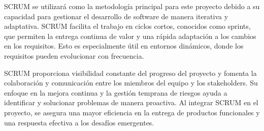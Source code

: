 SCRUM se utilizará como la metodología principal para este proyecto debido a su capacidad para gestionar el desarrollo de software de manera iterativa y adaptativa. SCRUM facilita el trabajo en ciclos cortos, conocidos como sprints, que permiten la entrega continua de valor y una rápida adaptación a los cambios en los requisitos. Esto es especialmente útil en entornos dinámicos, donde los requisitos pueden evolucionar con frecuencia.

SCRUM proporciona visibilidad constante del progreso del proyecto y fomenta la colaboración y comunicación entre los miembros del equipo y los stakeholders. Su enfoque en la mejora continua y la gestión temprana de riesgos ayuda a identificar y solucionar problemas de manera proactiva. Al integrar SCRUM en el proyecto, se asegura una mayor eficiencia en la entrega de productos funcionales y una respuesta efectiva a los desafíos emergentes.